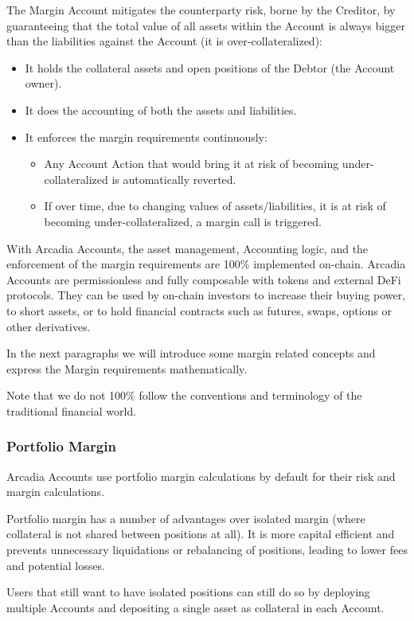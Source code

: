 \documentclass[sigconf,nonacm]{acmart}
\begin{document}
The Margin Account mitigates the counterparty risk, borne by the Creditor,
by guaranteeing that the total value of all assets within the Account is always bigger than the liabilities against the Account (it is over-collateralized):
\begin{itemize}
    \item It holds the collateral assets and open positions of the Debtor (the Account owner).
    \item It does the accounting of both the assets and liabilities.
    \item It enforces the margin requirements continuously:
    \begin{itemize}
        \item Any Account Action that would bring it at risk of becoming under-collateralized is automatically reverted.
        \item If over time, due to changing values of assets/liabilities, it is at risk of becoming under-collateralized, a margin call is triggered.
    \end{itemize}
\end{itemize}

With Arcadia Accounts, the asset management, Accounting logic, and the enforcement of the margin requirements are 100\% implemented on-chain.
Arcadia Accounts are permissionless and fully composable with tokens and external DeFi protocols.
They can be used by on-chain investors to increase their buying power, to short assets, or to hold financial contracts such as futures, swaps, options or other derivatives.

In the next paragraphs we will introduce some margin related concepts and express the Margin requirements mathematically.

Note that we do not 100\% follow the conventions and terminology of the traditional financial world.

\subsubsection{Portfolio Margin}
Arcadia Accounts use portfolio margin calculations by default for their risk and margin calculations.

Portfolio margin has a number of advantages over isolated margin (where collateral is not shared between positions at all).
It is more capital efficient and prevents unnecessary liquidations or rebalancing of positions, leading to lower fees and potential losses.

Users that still want to have isolated positions can still do so by deploying multiple Accounts and depositing a single asset as collateral in each Account.
\end{document}
